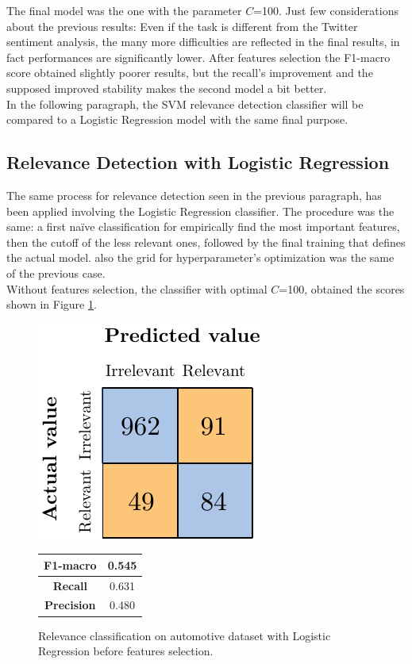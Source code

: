 The final model was the one with the parameter $C$=100. Just few considerations about the previous results: Even if the task is different from the Twitter sentiment analysis, the many more difficulties are reflected in the final results, in fact performances are significantly lower. After features selection the F1-macro score obtained slightly poorer results, but the recall's improvement and the supposed improved stability makes the second model a bit better.\\
In the following paragraph, the SVM relevance detection classifier will be compared to a Logistic Regression model with the same final purpose.


\subsection{Relevance Detection with Logistic Regression}

The same process for relevance detection seen in the previous paragraph, has been applied involving the Logistic Regression classifier. The procedure was the same: a first na{\"i}ve classification for empirically find the most important features, then the cutoff of the less relevant ones, followed by the final training that defines the actual model. also the grid for hyperparameter's optimization was the same of the previous case.\\
Without features selection, the classifier with optimal $C$=100, obtained the scores shown in Figure \ref{fig:ita_rel_logreg_bfs}.

\begin{figure}[H]
	\begin{minipage}[b]{0.6\linewidth}
		\centering
		\includegraphics[scale=1]{figures/conf_matrices/ita_rel_logreg/ita_rel_logreg_bfs.pdf}
	\end{minipage}
	\begin{minipage}[b]{0.3\linewidth}
		\begin{tabular}[b]{ | c | c | } 
			\hline
			\textbf{F1-macro} & 0.545 \\
			\hline
			\textbf{Recall} & 0.631 \\ 
			\hline
			\textbf{Precision} & 0.480 \\ 
			\hline
		\end{tabular}
	\end{minipage}
	\caption{Relevance classification on automotive dataset with Logistic Regression before features selection.}
	\label{fig:ita_rel_logreg_bfs}
\end{figure}

